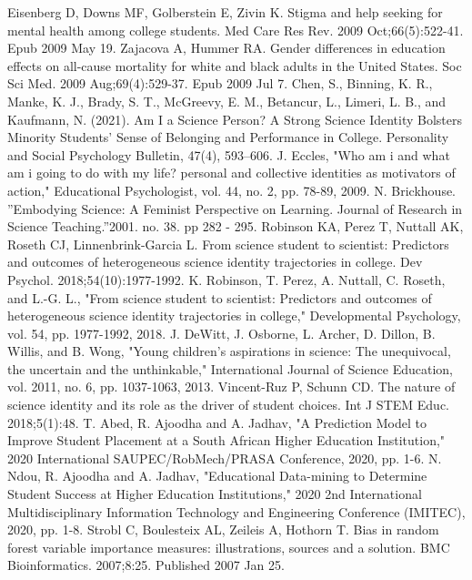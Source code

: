 \documentclass[conference]{IEEEtran}
\begin{document}
\begin{thebibliography}{00}
 Eisenberg D, Downs MF, Golberstein E, Zivin K. Stigma and help seeking for mental health among college students. Med Care Res Rev. 2009 Oct;66(5):522-41. Epub 2009 May 19.
 Zajacova A, Hummer RA. Gender differences in education effects on all-cause mortality for white and black adults in the United States. Soc Sci Med. 2009 Aug;69(4):529-37. Epub 2009 Jul 7.
 Chen, S., Binning, K. R., Manke, K. J., Brady, S. T., McGreevy, E. M., Betancur, L., Limeri, L. B., and Kaufmann, N. (2021). Am I a Science Person? A Strong Science Identity Bolsters Minority Students’ Sense of Belonging and Performance in College. Personality and Social Psychology Bulletin, 47(4), 593–606.
 J. Eccles, "Who am i and what am i going to do with my life? personal and collective identities as motivators of action," Educational Psychologist,
vol. 44, no. 2, pp. 78-89, 2009.
 N. Brickhouse. ''Embodying Science: A Feminist Perspective on Learning. Journal of Research in Science Teaching.''2001. no. 38. pp 282 - 295.
 Robinson KA, Perez T, Nuttall AK, Roseth CJ, Linnenbrink-Garcia L. From science student to scientist: Predictors and outcomes of heterogeneous science identity trajectories in college. Dev Psychol. 2018;54(10):1977-1992.
 K. Robinson, T. Perez, A. Nuttall, C. Roseth, and L.-G. L., "From science student to scientist: Predictors and outcomes of heterogeneous science identity trajectories in college," Developmental Psychology, vol. 54, pp. 1977-1992, 2018.
 J. DeWitt, J. Osborne, L. Archer, D. Dillon, B. Willis, and B. Wong, "Young children's aspirations in science: The unequivocal, the uncertain and the unthinkable," International Journal of Science Education, vol. 2011, no. 6, pp. 1037-1063, 2013.
 Vincent-Ruz P, Schunn CD. The nature of science identity and its role as the driver of student choices. Int J STEM Educ. 2018;5(1):48. 
 T. Abed, R. Ajoodha and A. Jadhav, "A Prediction Model to Improve Student Placement at a South African Higher Education Institution," 2020 International SAUPEC/RobMech/PRASA Conference, 2020, pp. 1-6.
 N. Ndou, R. Ajoodha and A. Jadhav, "Educational Data-mining to Determine Student Success at Higher Education Institutions," 2020 2nd International Multidisciplinary Information Technology and Engineering Conference (IMITEC), 2020, pp. 1-8.
 Strobl C, Boulesteix AL, Zeileis A, Hothorn T. Bias in random forest variable importance measures: illustrations, sources and a solution. BMC Bioinformatics. 2007;8:25. Published 2007 Jan 25.
\end{thebibliography}
\end{document}
